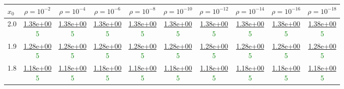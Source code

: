 \begin{table}[H]
\centering
\footnotesize
\begin{tabular}{|l||c|c|c|c|c|c|c|c|c|}
\toprule
$x_0$ & $\rho=10^{-2}$ & $\rho=10^{-4}$ & $\rho=10^{-6}$ & $\rho=10^{-8}$ & $\rho=10^{-10}$ & $\rho=10^{-12}$ & $\rho=10^{-14}$ & $\rho=10^{-16}$ & $\rho=10^{-18}$ \\
\midrule \midrule
2.0 & \makecell{\ul{1.38e+00} \\ \textcolor{Green}{5}} & \makecell{\ul{1.38e+00} \\ \textcolor{Green}{5}} & \makecell{\ul{1.38e+00} \\ \textcolor{Green}{5}} & \makecell{\ul{1.38e+00} \\ \textcolor{Green}{5}} & \makecell{\ul{1.38e+00} \\ \textcolor{Green}{5}} & \makecell{\ul{1.38e+00} \\ \textcolor{Green}{5}} & \makecell{\ul{1.38e+00} \\ \textcolor{Green}{5}} & \makecell{\ul{1.38e+00} \\ \textcolor{Green}{5}} & \makecell{\ul{1.38e+00} \\ \textcolor{Green}{5}} \\
\hline
 1.9 & \makecell{\ul{1.28e+00} \\ \textcolor{Green}{5}} & \makecell{\ul{1.28e+00} \\ \textcolor{Green}{5}} & \makecell{\ul{1.28e+00} \\ \textcolor{Green}{5}} & \makecell{\ul{1.28e+00} \\ \textcolor{Green}{5}} & \makecell{\ul{1.28e+00} \\ \textcolor{Green}{5}} & \makecell{\ul{1.28e+00} \\ \textcolor{Green}{5}} & \makecell{\ul{1.28e+00} \\ \textcolor{Green}{5}} & \makecell{\ul{1.28e+00} \\ \textcolor{Green}{5}} & \makecell{\ul{1.28e+00} \\ \textcolor{Green}{5}} \\
\hline
 1.8 & \makecell{\ul{1.18e+00} \\ \textcolor{Green}{5}} & \makecell{\ul{1.18e+00} \\ \textcolor{Green}{5}} & \makecell{\ul{1.18e+00} \\ \textcolor{Green}{5}} & \makecell{\ul{1.18e+00} \\ \textcolor{Green}{5}} & \makecell{\ul{1.18e+00} \\ \textcolor{Green}{5}} & \makecell{\ul{1.18e+00} \\ \textcolor{Green}{5}} & \makecell{\ul{1.18e+00} \\ \textcolor{Green}{5}} & \makecell{\ul{1.18e+00} \\ \textcolor{Green}{5}} & \makecell{\ul{1.18e+00} \\ \textcolor{Green}{5}} \\

\end{tabular}
\end{table}
